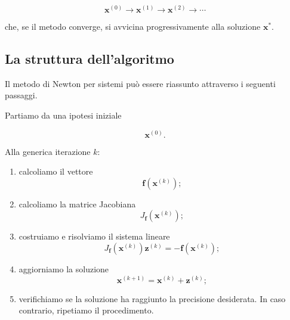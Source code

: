\begin{equation*}
    \mathbf{x}^{(0)}
    \longrightarrow
    \mathbf{x}^{(1)}
    \longrightarrow
    \mathbf{x}^{(2)}
    \longrightarrow
    \cdots
\end{equation*}

che, se il metodo converge, si avvicina progressivamente alla
soluzione $\mathbf{x}^*$.


\subsection{La struttura dell'algoritmo}

Il metodo di Newton per sistemi può essere riassunto attraverso i
seguenti passaggi.

Partiamo da una ipotesi iniziale

\begin{equation*}
    \mathbf{x}^{(0)}.
\end{equation*}

Alla generica iterazione $k$:

\begin{enumerate}
    \item calcoliamo il vettore
    \begin{equation*}
        \mathbf{f}(\mathbf{x}^{(k)});
    \end{equation*}

    \item calcoliamo la matrice Jacobiana
    \begin{equation*}
        J_{\mathbf{f}}(\mathbf{x}^{(k)});
    \end{equation*}

    \item costruiamo e risolviamo il sistema lineare
    \begin{equation*}
        J_{\mathbf{f}}(\mathbf{x}^{(k)})
        \mathbf{z}^{(k)}
        =
        -\mathbf{f}(\mathbf{x}^{(k)});
    \end{equation*}

    \item aggiorniamo la soluzione
    \begin{equation*}
        \mathbf{x}^{(k+1)}
        =
        \mathbf{x}^{(k)}
        +
        \mathbf{z}^{(k)};
    \end{equation*}

    \item verifichiamo se la soluzione ha raggiunto la precisione
    desiderata. In caso contrario, ripetiamo il procedimento.
\end{enumerate}

